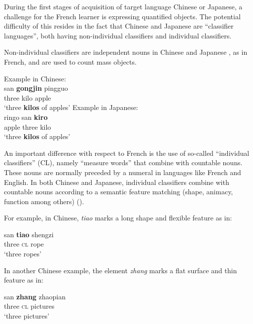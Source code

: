 \documentclass[output=paper,colorlinks,citecolor=brown,modfonts,nonflat]{../langscibook}
\begin{document}
\label{sec:watorek:4.2.2.2.2}

During the first stages of acquisition of target language Chinese or Japanese, a challenge for the French learner is expressing quantified objects. The potential difficulty of this resides in the fact that Chinese and Japanese are “classifier languages”, both having non-individual classifiers and individual classifiers.


Non-individual classifiers are independent nouns in Chinese  and Japanese , as in French, and are used to count mass objects.

\ea%
    \label{ex:watorek:12}
    \ea%
    \label{ex:watorek:12a}
    Example in Chinese:\\
    \gll    san \textbf{{gongjin}} pingguo\\
            three  {kilo} apple\\
    \glt    ‘three \textbf{kilos} of apples’
    \ex%
    \label{ex:watorek:12b}
    Example in Japanese:\\
    \gll    ringo san \textbf{\textbf{kiro}}\\
            apple three  {kilo}\\
    \glt    ‘three \textbf{{kilos}} of apples’
    \z
\z

An important difference with respect to French is the use of so-called “individual classifiers” (CL), namely “measure words” that combine with countable nouns. These nouns are normally preceded by a numeral in languages like French and English. In both Chinese and Japanese, individual classifiers combine with countable nouns according to a semantic feature matching (shape, animacy, function among others) (\citealt{Nishio2000,Zhang2007}).

For example, in Chinese, \textit{tiao} marks a long shape and flexible feature as in:

\ea%
    \label{ex:watorek:13}
    \gll    san \textbf{tiao} shengzi\\
            three  {\textsc{cl}} rope\\
    \glt    ‘three ropes’
\z

In another Chinese example, the element \textit{zhang} marks a flat surface and thin feature as in:

\ea%
    \label{ex:watorek:14}
    \gll    san \textbf{{zhang}} zhaopian\\
            three  {\textsc{cl}} pictures\\
    \glt    ‘three pictures’ 
\z
\end{document}
